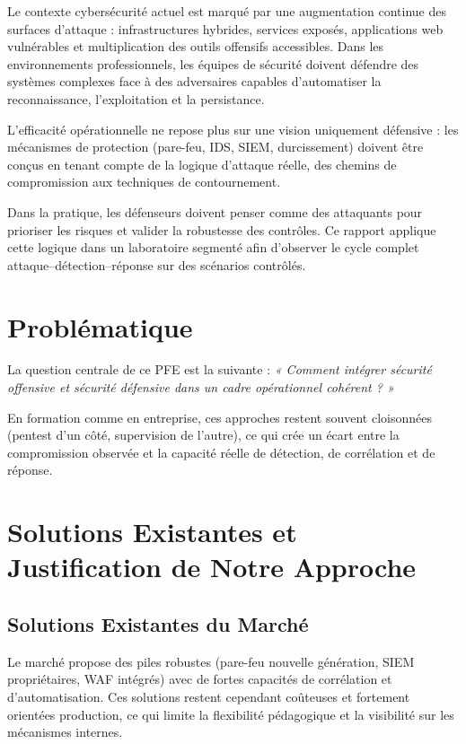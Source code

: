 \documentclass[12pt,a4paper,openany]{report}
\begin{document}
	Le contexte cybersécurité actuel est marqué par une augmentation continue des surfaces d'attaque : infrastructures hybrides, services exposés, applications web vulnérables et multiplication des outils offensifs accessibles. Dans les environnements professionnels, les équipes de sécurité doivent défendre des systèmes complexes face à des adversaires capables d'automatiser la reconnaissance, l'exploitation et la persistance.
	
	L'efficacité opérationnelle ne repose plus sur une vision uniquement défensive : les mécanismes de protection (pare-feu, IDS, SIEM, durcissement) doivent être conçus en tenant compte de la logique d'attaque réelle, des chemins de compromission aux techniques de contournement.
	
	Dans la pratique, les défenseurs doivent penser comme des attaquants pour prioriser les risques et valider la robustesse des contrôles. Ce rapport applique cette logique dans un laboratoire segmenté afin d'observer le cycle complet attaque--détection--réponse sur des scénarios contrôlés.
	
	\section{Problématique}
	
	La question centrale de ce PFE est la suivante : \textit{« Comment intégrer sécurité offensive et sécurité défensive dans un cadre opérationnel cohérent ? »}
	
	En formation comme en entreprise, ces approches restent souvent cloisonnées (pentest d'un côté, supervision de l'autre), ce qui crée un écart entre la compromission observée et la capacité réelle de détection, de corrélation et de réponse.
	
	\section{Solutions Existantes et Justification de Notre Approche}
	
	\subsection{Solutions Existantes du Marché}
	
	Le marché propose des piles robustes (pare-feu nouvelle génération, SIEM propriétaires, WAF intégrés) avec de fortes capacités de corrélation et d'automatisation. Ces solutions restent cependant coûteuses et fortement orientées production, ce qui limite la flexibilité pédagogique et la visibilité sur les mécanismes internes.
	
\end{document}
